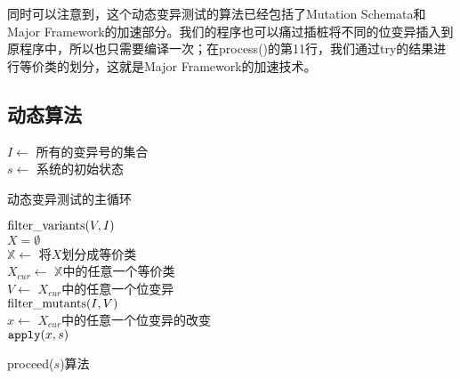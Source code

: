 \documentclass[nofonts]{ctexrep}
\begin{document}
同时可以注意到，这个动态变异测试的算法已经包括了Mutation Schemata和Major Framework的加速部分。我们的程序也可以痛过插桩将不同的位变异插入到原程序中，所以也只需要编译一次；在process()的第11行，我们通过try的结果进行等价类的划分，这就是Major Framework的加速技术。

\subsection{动态算法}
\begin{algorithm}[t]
  $I \leftarrow$ 所有的变异号的集合\\
  $s \leftarrow$ 系统的初始状态\\
\caption{动态变异测试的主循环}
\label{alg:main}
\end{algorithm}

\begin{algorithm}[t]
  ${\mathrm{filter\_variants}}(V, I)$\\
  $X = \emptyset$\\
  $\mathbb{X} \leftarrow$ 将$X$划分成等价类\\
  $X_{cur} \leftarrow$ $\mathbb{X}$中的任意一个等价类\\
  $V \leftarrow$ $X_{cur}$中的任意一个位变异\\
  $\mathrm{filter\_mutants}(I, V)$\\ 
  $x \leftarrow$ $X_{cur}$中的任意一个位变异的改变\\
  $\mathtt{apply}(x, s)$
\caption{proceed($s$)算法}
\label{alg:advanced}
\end{algorithm}
\end{document}

